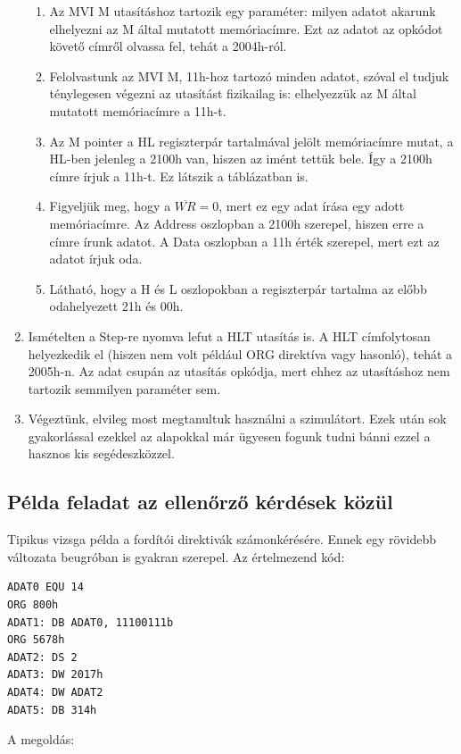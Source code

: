\documentclass{article}
\begin{document}
\begin{enumerate}
\begin{enumerate}
		\item Az MVI M utasításhoz tartozik egy paraméter: milyen adatot akarunk elhelyezni az M által mutatott memóriacímre. Ezt az adatot az opkódot követő címről olvassa fel, tehát a 2004h-ról.
		\item Felolvastunk az MVI M, 11h-hoz tartozó minden adatot, szóval el tudjuk ténylegesen végezni az utasítást fizikailag is: elhelyezzük az M által mutatott memóriacímre a 11h-t.
		\item Az M pointer a HL regiszterpár tartalmával jelölt memóriacímre mutat, a HL-ben jelenleg a 2100h van, hiszen az imént tettük bele. Így a 2100h címre írjuk a 11h-t. Ez látszik a táblázatban is. 
		\item Figyeljük meg, hogy a $\overline{WR} = 0$, mert ez egy adat írása egy adott memóriacímre. Az Address oszlopban a 2100h szerepel, hiszen erre a címre írunk adatot. A Data oszlopban a 11h érték szerepel, mert ezt az adatot írjuk oda.
		\item \colorbox{orange!30}{Látható, hogy a H és L oszlopokban a  regiszterpár tartalma az előbb odahelyezett 21h és 00h.}
	\end{enumerate}
	\item Ismételten a Step-re nyomva lefut a HLT utasítás is. A HLT címfolytosan helyezkedik el (hiszen nem volt például ORG direktíva vagy hasonló), tehát a 2005h-n. Az adat csupán az utasítás opkódja, mert ehhez az utasításhoz nem tartozik semmilyen paraméter sem.
	\item Végeztünk, elvileg most megtanultuk használni a szimulátort. Ezek után sok gyakorlással ezekkel az alapokkal már ügyesen fogunk tudni bánni ezzel a hasznos kis segédeszközzel.
\end{enumerate}

\subsection{Példa feladat az ellenőrző kérdések közül}
Tipikus vizsga példa a fordítói direktivák számonkérésére. Ennek egy rövidebb változata beugróban is gyakran szerepel.
Az értelmezend kód:

\begin{lstlisting}[frame=single]
ADAT0 EQU 14
ORG 800h
ADAT1: DB ADAT0, 11100111b
ORG 5678h
ADAT2: DS 2
ADAT3: DW 2017h
ADAT4: DW ADAT2
ADAT5: DB 314h
\end{lstlisting}

A megoldás:
\end{document}
